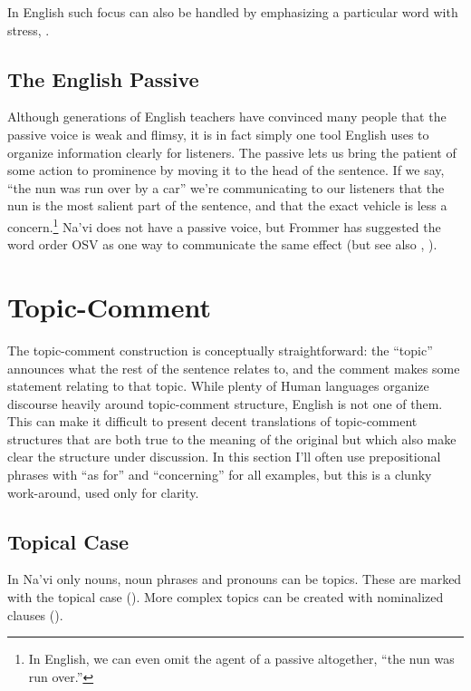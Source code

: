 \noindent In English such focus can also be handled by emphasizing a
particular word with stress, .


\subsection{The English Passive} Although generations of English
teachers have convinced many people that the passive voice is weak and
flimsy, it is in fact simply one tool English uses to organize
information clearly for listeners. 
The passive lets us bring the patient of some action to prominence by
moving it to the head of the sentence.  If we say, ``the nun was run
over by a car'' we're communicating to our listeners that the nun is
the most salient part of the sentence, and that the exact vehicle is
less a concern.\footnote{In English, we can even omit the agent of a
passive altogether, ``the nun was run over.''}  Na'vi does not have
a passive voice, but Frommer has suggested the word order OSV as one
way to communicate the same effect (but see also ,
).




\section{Topic-Comment}
\label{pragma:topic-comment}

\noindent The topic-comment construction is conceptually
straightforward: the ``topic'' announces what the rest of the sentence
relates to, and the comment makes some statement relating to that
topic.  While plenty of Human languages organize discourse heavily
around topic-comment structure, English is not one of them.  This can
make it difficult to present decent translations of topic-comment
structures that are both true to the meaning of the original but which
also make clear the structure under discussion.  In this section I'll
often use prepositional phrases with ``as for'' and ``concerning'' for
all examples, but this is a clunky work-around, used only for clarity.

\subsection{Topical Case} In Na'vi only nouns, noun phrases and
pronouns can be topics.  These are marked with the topical case
().  More complex topics can be created with nominalized
clauses ().

